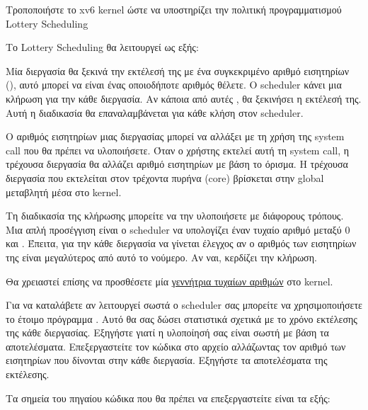 \documentclass[18pt]{extarticle}
\begin{document}
\begin{question}
    Τροποποιήστε το xv6 kernel ώστε να υποστηρίζει την πολιτική προγραμματισμού Lottery Scheduling \cite{OSTEP-SchedLottery, LotteryScheduling1994}

    Το Lottery Scheduling θα λειτουργεί ως εξής:

    Μία διεργασία θα ξεκινά την εκτέλεσή της με ένα συγκεκριμένο αριθμό εισητηρίων (), αυτό μπορεί να είναι ένας οποιοδήποτε αριθμός θέλετε.
    Ο scheduler κάνει μια κλήρωση για την κάθε διεργασία. Αν κάποια από αυτές , θα ξεκινήσει η εκτέλεσή της.
    Αυτή η διαδικασία θα επαναλαμβάνεται για κάθε κλήση στον scheduler.

    Ο αριθμός εισητηρίων μιας διεργασίας μπορεί να αλλάξει με τη χρήση της system call  που θα πρέπει να υλοποιήσετε.
    Όταν ο χρήστης εκτελεί αυτή τη system call, η τρέχουσα διεργασία θα αλλάζει αριθμό εισητηρίων με βάση το όρισμα. Η τρέχουσα διεργασία 
    που εκτελείται στον τρέχοντα πυρήνα (core) βρίσκεται στην global μεταβλητή  μέσα στο kernel.

    Τη διαδικασία της κλήρωσης μπορείτε να την υλοποιήσετε με διάφορους τρόπους.
    Μια απλή προσέγγιση είναι ο scheduler να υπολογίζει έναν τυχαίο αριθμό μεταξύ 0 και .
    Έπειτα, για την κάθε διεργασία να γίνεται έλεγχος αν ο αριθμός των εισητηρίων της είναι μεγαλύτερος από αυτό το νούμερο. Αν ναι, κερδίζει την κλήρωση.

    Θα χρειαστεί επίσης να προσθέσετε μία \href{https://wiki.osdev.org/Random_Number_Generator#Pseudorandom_number_generators}{γεννήτρια τυχαίων αριθμών} στο kernel.

    Για να καταλάβετε αν λειτουργεί σωστά ο scheduler σας μπορείτε να χρησιμοποιήσετε 
    το έτοιμο πρόγραμμα . Αυτό θα σας δώσει στατιστικά σχετικά με το χρόνο εκτέλεσης 
    της κάθε διεργασίας. Εξηγήστε γιατί η υλοποίησή σας είναι σωστή με βάση τα αποτελέσματα.
    Επεξεργαστείτε τον κώδικα στο αρχείο  αλλάζωντας τον αριθμό των εισητηρίων 
    που δίνονται στην κάθε διεργασία. Εξηγήστε τα αποτελέσματα της εκτέλεσης.

    \begin{info}[Βοήθεια:]
        Τα σημεία του πηγαίου κώδικα που θα πρέπει να επεξεργαστείτε είναι τα εξής: 
        

\end{info}
\end{question}
\end{document}
